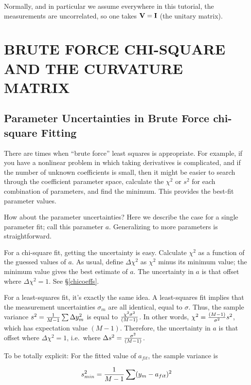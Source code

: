 \documentclass[psfig,preprint]{aastex}
\begin{document}
	Normally, and in particular we assume everywhere in this
tutorial, the measurements are uncorrelated, so one takes ${\bf V} =
{\bf I}$ (the unitary matrix). 


\section{BRUTE FORCE CHI-SQUARE AND THE CURVATURE MATRIX}

\subsection{Parameter Uncertainties in Brute Force chi-square Fitting}

	There are times when ``brute force'' least squares is
appropriate.  For example, if you have a nonlinear problem in which
taking derivatives is complicated, and if the number of unknown
coefficients is small, then it might be easier to search through the
coefficient parameter space, calculate the $\chi^2$ or $s^2$ for each
combination of parameters, and find the minimum. This provides the
best-fit parameter values. 

	How about the parameter uncertainties? Here we describe the case
for a single parameter fit; call this parameter $a$. Generalizing to
more parameters is straightforward.

	For a chi-square fit, getting the uncertainty is easy. Calculate
$\chi^2$ as a function of the guessed values of $a$. As usual, define
$\Delta \chi^2$ as $\chi^2$ minus its minimum value; the minimum value
gives the best estimate of $a$. The uncertainty in $a$ is that offset
where $\Delta \chi^2 = 1$. See \S \ref{chicoeffs}.

	For a least-squares fit, it's exactly the same idea. A
least-squares fit implies that the measurement uncertainties $\sigma_m$
are all identical, equal to $\sigma$. Thus, the sample variance $s^2 =
{1 \over M-1} \sum \Delta y_m^2$ is equal to $\chi^2 \sigma^2 \over
(M-1)$. In other words, $\chi^2 = {(M-1) \over \sigma^2} s^2$, which has
expectation value $(M-1)$. Therefore, the uncertainty in $a$ is that
offset where $\Delta \chi^2 = 1$, i.e.\ where $\Delta s^2 = {\sigma^2
\over (M-1)}$.

	To be totally explicit: 
For the fitted
value of $a_{fit}$, the sample variance is

\begin{equation}
s_{min}^2 = {1 \over M-1} \sum (y_m - a_{fit})^2
\end{equation}
\end{document}
